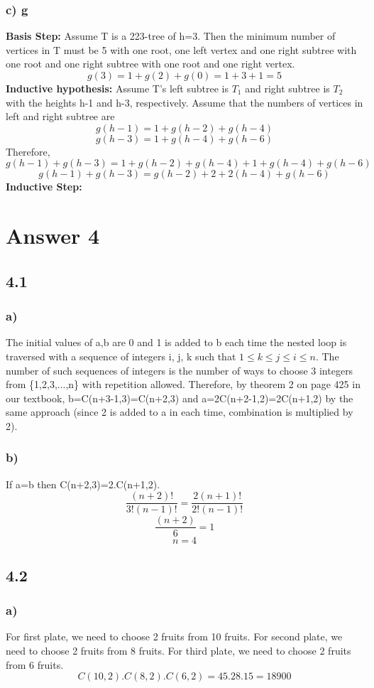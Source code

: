 \documentclass[12pt]{article}
\begin{document}
\subsubsection*{c) g}
\textbf{Basis Step:} Assume T is a 223-tree of h=3. Then the minimum number of vertices in T must be 5 with one root, one left vertex and one right subtree with one root and one right subtree with one root and one right vertex.
$$g(3)=1+g(2)+g(0)=1+3+1=5$$
\textbf{Inductive hypothesis:} Assume T's left subtree is $T_1$ and right subtree is $T_2$ with the heights h-1 and h-3, respectively. Assume that the numbers of vertices in left and right subtree are
$$g(h-1)=1+g(h-2)+g(h-4)$$
$$g(h-3)=1+g(h-4)+g(h-6)$$
Therefore,
$$g(h-1)+g(h-3)=1+g(h-2)+g(h-4)+1+g(h-4)+g(h-6)$$
$$g(h-1)+g(h-3)=g(h-2)+2+2(h-4)+g(h-6)$$
\textbf{Inductive Step:}
\section*{Answer 4}
\subsection*{4.1}
\subsubsection*{a)}
The initial values of a,b are 0 and 1 is added to b each time the nested loop is traversed with a sequence of integers i, j, k such that $1\leq k\leq j\leq i\leq n$. The number of such sequences of integers is the number of ways to choose 3 integers from \{1,2,3,...,n\} with repetition allowed. Therefore, by theorem 2 on page 425 in our textbook, b=C(n+3-1,3)=C(n+2,3) and a=2C(n+2-1,2)=2C(n+1,2) by the same approach (since 2 is added to a in each time, combination is multiplied by 2).
\subsubsection*{b)}
If a=b then C(n+2,3)=2.C(n+1,2).
$$\dfrac{(n+2)!}{3!(n-1)!}=\dfrac{2(n+1)!}{2!(n-1)!}$$
$$\dfrac{(n+2)}{6}=1$$
$$n=4$$

\subsection*{4.2}
\subsubsection*{a)}
For first plate, we need to choose 2 fruits from 10 fruits. For second plate, we need to choose 2 fruits from 8 fruits. For third plate, we need to choose 2 fruits from 6 fruits.
$$C(10,2).C(8,2).C(6,2)=45.28.15=18900$$
\end{document}
